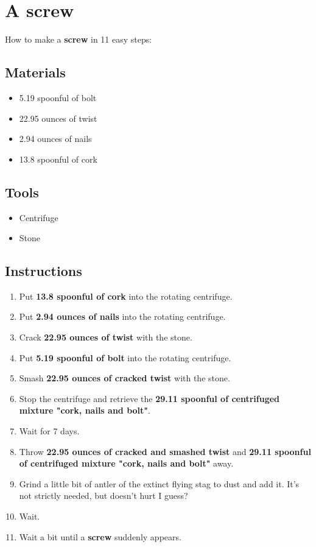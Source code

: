 \documentclass{article}
\begin{document}
\section{A screw}How to make a \textbf{screw} in 11 easy steps:

\subsection{Materials}\begin{itemize}
\item 
5.19 spoonful of bolt
\item 
22.95 ounces of twist
\item 
2.94 ounces of nails
\item 
13.8 spoonful of cork
\end{itemize}
\subsection{Tools}\begin{itemize}
\item 
Centrifuge
\item 
Stone
\end{itemize}
\subsection{Instructions}\begin{enumerate}
\item 
Put \textbf{13.8 spoonful of cork} into the rotating centrifuge.
\item 
Put \textbf{2.94 ounces of nails} into the rotating centrifuge.
\item 
Crack \textbf{22.95 ounces of twist} with the stone.
\item 
Put \textbf{5.19 spoonful of bolt} into the rotating centrifuge.
\item 
Smash \textbf{22.95 ounces of cracked twist} with the stone.
\item 
Stop the centrifuge and retrieve the \textbf{29.11 spoonful of centrifuged mixture "cork, nails and bolt"}.
\item 
Wait for 7 days.
\item 
Throw \textbf{22.95 ounces of cracked and smashed twist} and \textbf{29.11 spoonful of centrifuged mixture "cork, nails and bolt"} away.
\item 
Grind a little bit of antler of the extinct flying stag to dust and add it. It's not strictly needed, but doesn't hurt I guess?
\item 
Wait.
\item 
Wait a bit until a \textbf{screw} suddenly appears.
\end{enumerate}
\newpage
\end{document}
